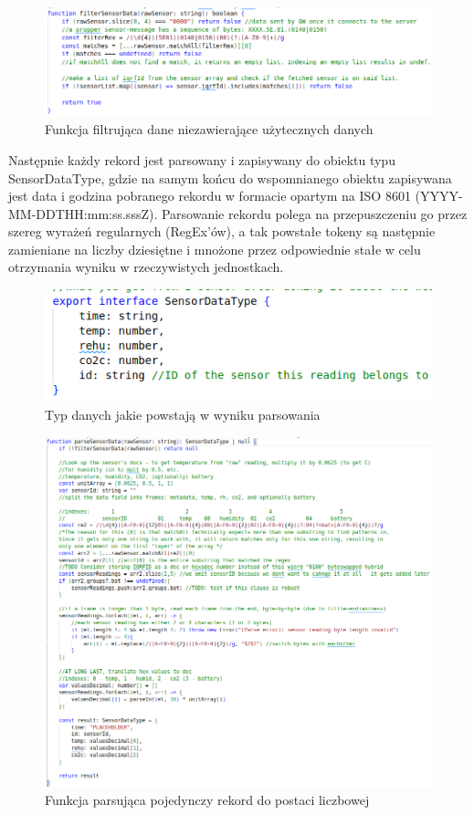 \begin{figure}[H]
    \includegraphics[width=\textwidth]{zdj/app/filter.png}
    \caption{Funkcja filtrująca dane niezawierające użytecznych danych}
\end{figure}

Następnie każdy rekord jest parsowany i zapisywany do obiektu typu SensorDataType, gdzie na samym końcu do wspomnianego
obiektu zapisywana jest data i godzina pobranego rekordu w formacie opartym na ISO 8601 (YYYY-MM-DDTHH:mm:ss.sssZ). 
Parsowanie rekordu polega na przepuszczeniu go przez szereg wyrażeń regularnych (RegEx'ów), a tak powstałe tokeny są następnie zamieniane na liczby
dziesiętne i mnożone przez odpowiednie stałe \cite{protronix-comms} w celu otrzymania wyniku w rzeczywistych jednostkach.

\begin{figure}[H]
    \includegraphics[width=\textwidth]{zdj/app/type.png}
    \caption{Typ danych jakie powstają w wyniku parsowania}
\end{figure}

\begin{figure}[H]
    \includegraphics[width=\textwidth]{zdj/app/parse-sensor.png}
    \caption{Funkcja parsująca pojedynczy rekord do postaci liczbowej}
\end{figure}

